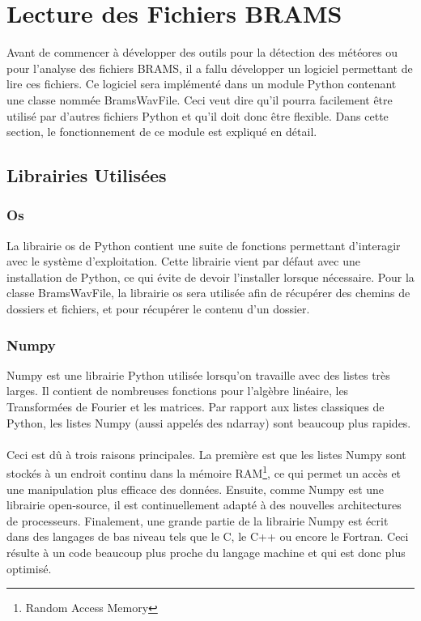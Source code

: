 \documentclass[11pt]{article}
\begin{document}
\newpage

\section{Lecture des Fichiers BRAMS}

Avant de commencer à développer des outils pour la détection des météores ou pour l'analyse des fichiers BRAMS, il a fallu développer un logiciel permettant de lire ces fichiers.
Ce logiciel sera implémenté dans un module Python contenant une classe nommée BramsWavFile.
Ceci veut dire qu'il pourra facilement être utilisé par d'autres fichiers Python et qu'il doit donc être flexible.
Dans cette section, le fonctionnement de ce module est expliqué en détail.

\subsection{Librairies Utilisées}

\subsubsection{Os}

La librairie os de Python contient une suite de fonctions permettant d'interagir avec le système d'exploitation.
Cette librairie vient par défaut avec une installation de Python, ce qui évite de devoir l'installer lorsque nécessaire.
Pour la classe BramsWavFile, la librairie os sera utilisée afin de récupérer des chemins de dossiers et fichiers, et pour récupérer le contenu d'un dossier.

\subsubsection{Numpy} \label{NUMPY1}

Numpy est une librairie Python utilisée lorsqu'on travaille avec des listes très larges.
Il contient de nombreuses fonctions pour l'algèbre linéaire, les Transformées de Fourier et les matrices.
Par rapport aux listes classiques de Python, les listes Numpy (aussi appelés des ndarray) sont beaucoup plus rapides.\\
\\
Ceci est dû à trois raisons principales.
La première est que les listes Numpy sont stockés à un endroit continu dans la mémoire RAM\footnote{Random Access Memory}, ce qui permet un accès et une manipulation plus efficace des données.
Ensuite, comme Numpy est une librairie open-source, il est continuellement adapté à des nouvelles architectures de processeurs.
Finalement, une grande partie de la librairie Numpy est écrit dans des langages de bas niveau tels que le C, le C++ ou encore le Fortran.
Ceci résulte à un code beaucoup plus proche du langage machine et qui est donc plus optimisé.
\end{document}
